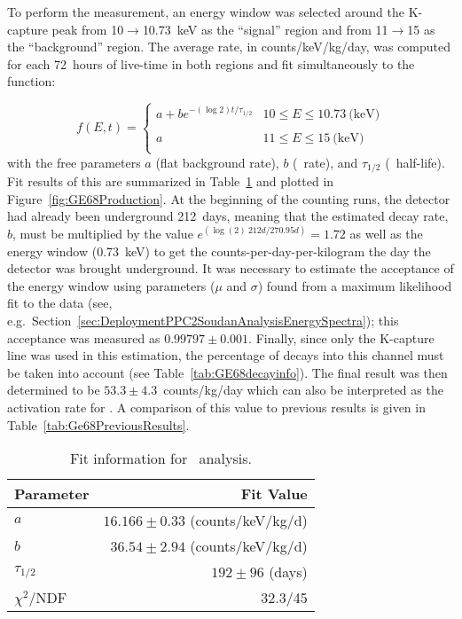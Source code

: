 	To perform the measurement, an energy window was selected around the K-capture peak from 10$\to$10.73~keV as the ``signal'' region and from 11$\to$15 as the ``background'' region.  The average rate, in counts/keV/kg/day, was computed for each 72~hours of live-time in both regions and fit simultaneously to the function:
	
			\begin{equation}
				f(E,t) = \left\{ 
				\begin{array}{lr} 
 					a + b e^{-\left( \log{2} \right) t/\tau_{1/2}} & 10 \leq E \leq 10.73~\textrm{(keV)}\\
					\\
					a & 11 \leq E \leq 15~\textrm{(keV)}\\
				\end{array} \right.			
			\end{equation}
with the free parameters $a$ (flat background rate), $b$ (\gersixeight~rate), and $\tau_{1/2}$ (\gersixeight~half-life).  Fit results of this are summarized in Table~\ref{tab:Ge68FitResults} and plotted in Figure~\ref{fig:GE68Production}.  At the beginning of the counting runs, the detector had already been underground 212~days, meaning that the estimated decay rate, $b$, must be multiplied by the value $e^{(\log(2)~212 d/270.95 d)} = 1.72$ as well as  the energy window (0.73~keV) to get the counts-per-day-per-kilogram the day the detector was brought underground.  It was necessary to estimate the acceptance of the energy window using parameters ($\mu$ and $\sigma$) found from a maximum likelihood fit to the data (see, e.g.~Section~\ref{sec:DeploymentPPC2SoudanAnalysisEnergySpectra}); this acceptance was measured as $0.99797\pm0.001$.  Finally, since only the K-capture line was used in this estimation, the percentage of decays into this channel must be taken into account (see Table~\ref{tab:GE68decayinfo}).  The final result was then determined to be $53.3\pm4.3$~counts/kg/day which can also be interpreted as the activation rate for \gersixeight.  A comparison of this value to previous results is given in Table~\ref{tab:Ge68PreviousResults}.

       			\begin{table}
				\centering
				\begin{tabular}{l|r}
					\hline
					Parameter & Fit Value \\
					\hline
					$a$ & $16.166\pm0.33$ (counts/keV/kg/d)  \\
					$b$ & $36.54\pm2.94$ (counts/keV/kg/d)  \\
					$\tau_{1/2}$ & $192\pm96$ (days) \\
					$\chi^{2}$/NDF & 32.3/45 \\					
					\hline
				\end{tabular}
				\caption{Fit information for \gersixeight~analysis.}
				\label{tab:Ge68FitResults}	
			\end{table}	
			
